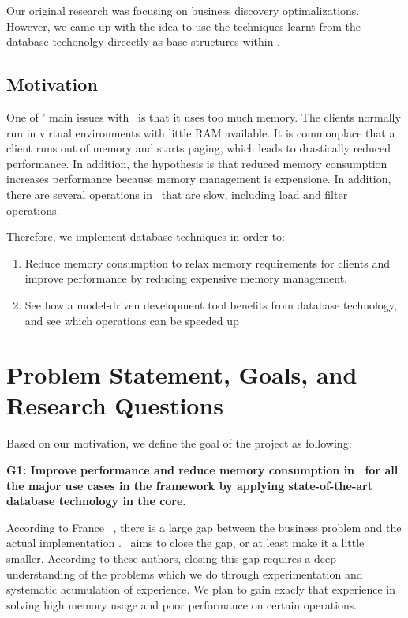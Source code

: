 
Our original research was focusing on business discovery optimalizations. However, we came up with the idea to use the techniques learnt from the database techonolgy dircectly as base structures within \gap.

\subsection{Motivation}
\label{sub:Motivation}
One of \genus' main issues with \gap~is that it uses too much memory. The clients normally run in virtual environments with little RAM available. It is commonplace that a client runs out of memory and starts paging, which leads to drastically reduced performance. In addition, the hypothesis is that reduced memory consumption increases performance because memory management is expensione. In addition, there are several operations in \gap~that are slow, including  load and filter operations.

Therefore, we implement database techniques in order to:
\begin{enumerate}
    \item Reduce memory consumption to relax memory requirements for clients and improve performance by reducing expensive memory management.
    \item See how a model-driven development tool benefits from database technology, and see which operations can be speeded up
\end{enumerate}

\section{Problem Statement, Goals, and Research Questions}
\label{sec:Problem Statement, Goals, and Research Questions}
Based on our motivation, we define the goal of the project as following: 

\textbf{G1: Improve performance and reduce memory consumption in \gap~for all the major use cases in the framework by applying state-of-the-art database technology in the core.}

According to France \ea~, there is a large gap between the business problem and the actual implementation \cite{France2007-ae}. \mdd~aims to close the gap, or at least make it a little smaller. According to these authors, closing this gap requires a deep understanding of the problems which we do through experimentation and systematic acumulation of experience. We plan to gain exacly that experience in solving high memory usage and poor performance on certain operations. 

